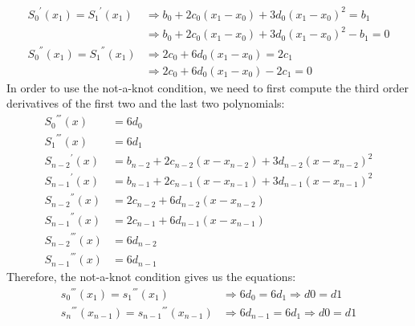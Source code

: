 \begin{answer}
    \begin{align}
        {S_0}^{'}(x_1) = {S_1}^{'}(x_1) &\Rightarrow b_0 + 2c_0(x_1-x_0) + 3d_0(x_1-x_0)^2 = b_1\\
        &\Rightarrow b_0 + 2c_0(x_1-x_0) + 3d_0(x_1-x_0)^2 - b_1 = 0\\
        {S_0}^{''}(x_1) = {S_1}^{''}(x_1) &\Rightarrow 2c_0 + 6d_0(x_1-x_0) = 2c_1\\
        &\Rightarrow 2c_0 + 6d_0(x_1-x_0) - 2c_1 = 0
    \end{align}
    In order to use the not-a-knot condition, we need to first compute the third order derivatives of the first two and the last two polynomials:
    \begin{align}
        {S_0}^{'''}(x) &= 6d_0\\
        {S_1}^{'''}(x) &= 6d_1\\
        {S_{n-2}}^{'}(x) &= b_{n-2} + 2c_{n-2}(x-x_{n-2}) + 3d_{n-2}(x-x_{n-2})^2\\
        {S_{n-1}}^{'}(x) &= b_{n-1} + 2c_{n-1}(x-x_{n-1}) + 3d_{n-1}(x-x_{n-1})^2\\
        {S_{n-2}}^{''}(x) &= 2c_{n-2} + 6d_{n-2}(x-x_{n-2})\\
        {S_{n-1}}^{''}(x) &= 2c_{n-1} + 6d_{n-1}(x-x_{n-1})\\
        {S_{n-2}}^{'''}(x) &= 6d_{n-2}\\
        {S_{n-1}}^{'''}(x) &= 6d_{n-1}
    \end{align}
    Therefore, the not-a-knot condition gives us the equations:
    \begin{align}
        {s_0}^{'''}(x_1) = {s_1}^{'''}(x_1) &\Rightarrow 6d_0 = 6d_1 \Rightarrow d0 = d1\\
        {s_n}^{'''}(x_{n-1}) = {s_{n-1}}^{'''}(x_{n-1}) &\Rightarrow 6d_{n-1} = 6d_1 \Rightarrow d0 = d1
    \end{align}
\end{answer}